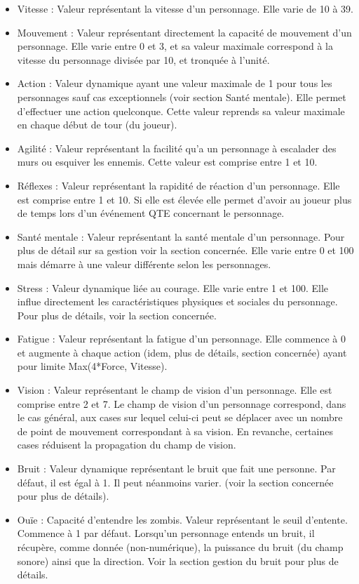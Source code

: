 \begin{itemize}
  \item Vitesse : Valeur représentant la vitesse d'un personnage. Elle varie de 10 à 39.
  \item Mouvement : Valeur représentant directement la capacité de mouvement d'un personnage. Elle varie entre 0 et 3, et sa valeur maximale correspond à la vitesse du personnage divisée par 10, et tronquée à l'unité.
  \item Action : Valeur dynamique ayant une valeur maximale de 1 pour tous les personnages sauf cas exceptionnels (voir section Santé mentale). Elle permet d'effectuer une action quelconque. Cette valeur reprends sa valeur maximale en chaque début de tour (du joueur).
  \item Agilité : Valeur représentant la facilité qu'a un personnage à escalader des murs ou esquiver les ennemis. Cette valeur est comprise entre 1 et 10.
  \item Réflexes : Valeur représentant la rapidité de réaction d'un personnage. Elle est comprise entre 1 et 10. Si elle est élevée elle permet d'avoir au joueur plus de temps lors d'un événement QTE concernant le personnage.
  \item Santé mentale : Valeur représentant la santé mentale d'un personnage. Pour plus de détail sur sa gestion voir la section concernée. Elle varie entre 0 et 100 mais démarre à une valeur différente selon les personnages.
  \item Stress : Valeur dynamique liée au courage. Elle varie entre 1 et 100. Elle influe directement les caractéristiques physiques et sociales du personnage. Pour plus de détails, voir la section concernée.
  \item Fatigue : Valeur représentant la fatigue d'un personnage. Elle commence à 0 et augmente à chaque action (idem, plus de détails, section concernée) ayant pour limite Max(4*Force, Vitesse).
  \item Vision : Valeur représentant le champ de vision d'un personnage. Elle est comprise entre 2 et 7. Le champ de vision d'un personnage correspond, dans le cas général, aux cases sur lequel celui-ci peut se déplacer avec un nombre de point de mouvement correspondant à sa vision. En revanche, certaines cases réduisent la propagation du champ de vision.
  \item Bruit : Valeur dynamique représentant le bruit que fait une personne. Par défaut, il est égal à 1. Il peut néanmoins varier. (voir la section concernée pour plus de détails).
  \item Ouïe : Capacité d'entendre les zombis. Valeur représentant le seuil d'entente. Commence à 1 par défaut. Lorsqu'un personnage entends un bruit, il récupère, comme donnée (non-numérique), la puissance du bruit (du champ sonore) ainsi que la direction. Voir la section gestion du bruit pour plus de détails. 
\end{itemize}

